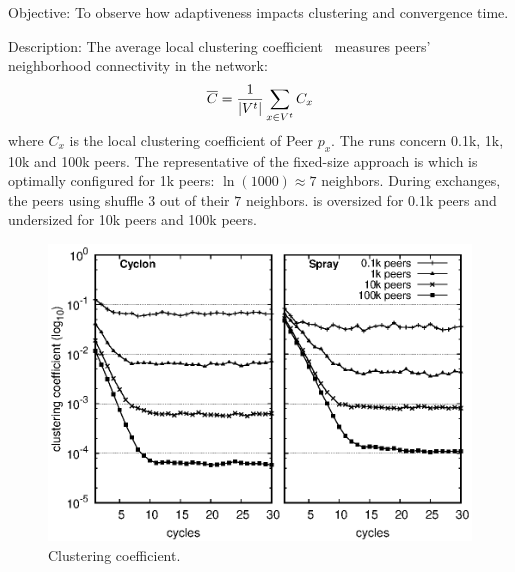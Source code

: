 \begin{asparadesc}
\item[Objective:] To observe how adaptiveness impacts clustering and convergence
  time.
\item[Description:] The average local clustering
  coefficient~\cite{watts1998collective} measures peers' neighborhood
  connectivity in the network:
  \begin{equation*}
    \overline{C} = {1\over |V^t|}\sum\limits_{x\in V^t}C_x
  \end{equation*}
  where $C_x$ is the local clustering coefficient of Peer $p_x$.  The
  runs concern 0.1k, 1k, 10k and 100k peers. The representative of the
  fixed-size approach is \CYCLON which is optimally configured for 1k
  peers: $\ln(1000)\approx 7$ neighbors. During exchanges, the peers
  using \CYCLON shuffle $3$ out of their $7$ neighbors. \CYCLON is
  oversized for 0.1k peers and undersized for 10k peers and 100k
  peers.

\begin{figure}
  \centering
  \includegraphics[width=\SCALE\textwidth]{img/clustering.eps}
  \caption{\label{fig:clustering}Clustering coefficient.}
\end{figure}


\end{asparadesc}
